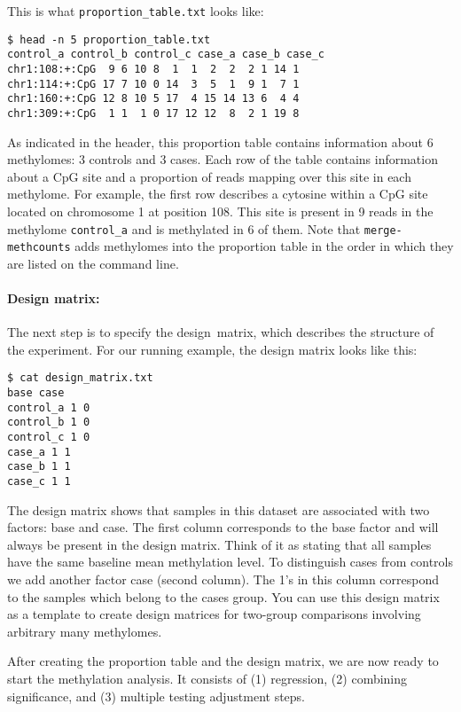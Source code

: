 \documentclass[10pt]{article}
\newcommand{\prog}[1]{\texttt{#1}}
\begin{document}
This is what {\tt proportion\_table.txt} looks like:

{\small{%
\begin{verbatim}
$ head -n 5 proportion_table.txt
control_a control_b control_c case_a case_b case_c
chr1:108:+:CpG  9 6 10 8  1  1  2  2  2 1 14 1
chr1:114:+:CpG 17 7 10 0 14  3  5  1  9 1  7 1
chr1:160:+:CpG 12 8 10 5 17  4 15 14 13 6  4 4
chr1:309:+:CpG  1 1  1 0 17 12 12  8  2 1 19 8
\end{verbatim}%
}}

As indicated in the header, this proportion table contains information about 6
methylomes: 3 controls and 3 cases. Each row of the table contains information
about a CpG site and a proportion of reads mapping over this site in each
methylome. For example, the first row describes a cytosine within a CpG site
located on chromosome 1 at position 108. This site is present in 9 reads in the
methylome {\tt control\_a} and is methylated in 6 of them. Note that 
\prog{merge-methcounts} adds methylomes into the proportion table in the order 
in which they are listed on the command line.

\paragraph{Design matrix:} The next step is to specify the design\ matrix, which
describes the structure of the experiment. For our running example, the design
matrix looks like this:

{\small{%
\begin{verbatim}
$ cat design_matrix.txt
base case
control_a 1 0
control_b 1 0
control_c 1 0
case_a 1 1
case_b 1 1
case_c 1 1
\end{verbatim}%
}}

The design matrix shows that samples in this dataset are associated with two 
factors: base and case. The first column corresponds to the base factor and 
will always be present in the design matrix. Think of it as stating that all 
samples have the same baseline mean methylation level. To distinguish 
cases from controls we add another factor case (second column). The 1's in 
this column correspond to the samples which belong to the cases group. You 
can use this design matrix as a template to create design matrices for 
two-group comparisons involving arbitrary many methylomes.

After creating the proportion table and the design matrix, we are now ready
to start the methylation analysis. It consists of (1) regression, (2)
combining significance, and (3) multiple testing adjustment steps.
\end{document}
